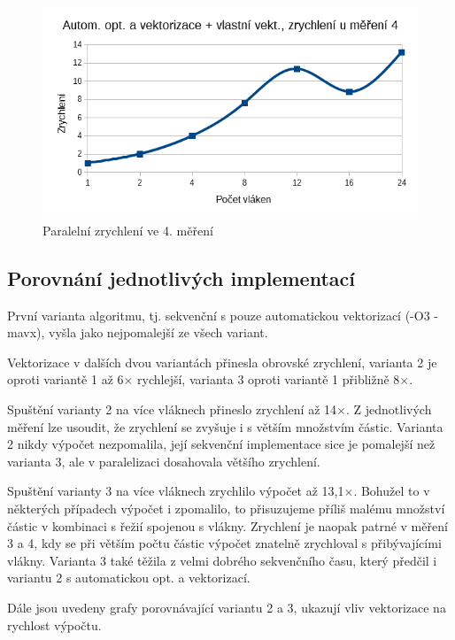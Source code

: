 \documentclass[12pt]{article}
\begin{document}
\begin{figure}[H]
  \begin{center}
     \includegraphics[width=12cm]{images/ssef4acc.png}
    \caption{Paralelní zrychlení ve 4. měření} 
  \end{center}
\end{figure}

\subsection{Porovnání jednotlivých implementací}
První varianta algoritmu, tj. sekvenční s pouze automatickou vektorizací (-O3 -mavx), vyšla jako nejpomalejší ze všech variant.

Vektorizace v dalších dvou variantách přinesla obrovské zrychlení, varianta 2 je oproti variantě 1 až 6${\times}$ rychlejší, varianta 3 oproti variantě 1 přibližně 8${\times}$.

Spuštění varianty 2 na více vláknech přineslo zrychlení až 14${\times}$. Z jednotlivých měření lze usoudit, že zrychlení se zvyšuje i s větším množstvím částic.
Varianta 2 nikdy výpočet nezpomalila, její sekvenční implementace sice je pomalejší než varianta 3, ale v paralelizaci dosahovala většího zrychlení.

Spuštění varianty 3 na více vláknech zrychlilo výpočet až 13,1${\times}$.
Bohužel to v některých případech výpočet i zpomalilo, to přisuzujeme příliš malému množství částic v kombinaci s řežií spojenou s vlákny.
Zrychlení je naopak patrné v měření 3 a 4, kdy se při větším počtu částic výpočet znatelně zrychloval s přibývajícími vlákny.
Varianta 3 také těžila z velmi dobrého sekvenčního času, který předčil i variantu 2 s automatickou opt. a vektorizací.

Dále jsou uvedeny grafy porovnávající variantu 2 a 3, ukazují vliv vektorizace na rychlost výpočtu.
\end{document}
